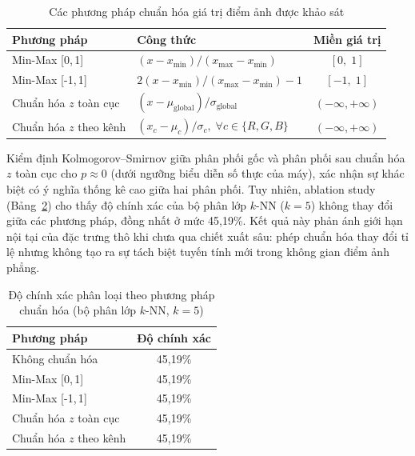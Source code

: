 \begin{table}[H]
    \centering
    \caption{Các phương pháp chuẩn hóa giá trị điểm ảnh được khảo sát}
    \label{tab:normalization}
    \begin{tabular}{llc}
        \hline
        \textbf{Phương pháp} & \textbf{Công thức} & \textbf{Miền giá trị} \\
        \hline
        Min-Max {[}0,\,1{]}       & $(x - x_{\min}) / (x_{\max} - x_{\min})$
            & $[0,\;1]$ \\
        Min-Max {[}-1,\,1{]}      & $2(x - x_{\min}) / (x_{\max} - x_{\min}) - 1$
            & $[-1,\;1]$ \\
        Chuẩn hóa $z$ toàn cục   & $(x - \mu_{\text{global}}) / \sigma_{\text{global}}$
            & $(-\infty,+\infty)$ \\
        Chuẩn hóa $z$ theo kênh  & $(x_c - \mu_c) / \sigma_c,\;\forall c \in \{R,G,B\}$
            & $(-\infty,+\infty)$ \\
        \hline
    \end{tabular}
\end{table}

Kiểm định Kolmogorov--Smirnov giữa phân phối gốc và phân phối sau chuẩn hóa
$z$ toàn cục cho $p \approx 0$ (dưới ngưỡng biểu diễn số thực của máy), xác
nhận sự khác biệt có ý nghĩa thống kê cao giữa hai phân phối. Tuy nhiên,
ablation study (Bảng~\ref{tab:norm_ablation}) cho thấy độ chính xác của bộ
phân lớp $k$-NN ($k = 5$) không thay đổi giữa các phương pháp, đồng nhất ở
mức 45,19\%. Kết quả này phản ánh giới hạn nội tại của đặc trưng thô khi chưa
qua chiết xuất sâu: phép chuẩn hóa thay đổi tỉ lệ nhưng không tạo ra sự tách
biệt tuyến tính mới trong không gian điểm ảnh phẳng.

\begin{table}[H]
    \centering
    \caption{Độ chính xác phân loại theo phương pháp chuẩn hóa
        (bộ phân lớp $k$-NN, $k=5$)}
    \label{tab:norm_ablation}
    \begin{tabular}{lc}
        \hline
        \textbf{Phương pháp} & \textbf{Độ chính xác} \\
        \hline
        Không chuẩn hóa          & 45,19\% \\
        Min-Max {[}0,\,1{]}      & 45,19\% \\
        Min-Max {[}-1,\,1{]}     & 45,19\% \\
        Chuẩn hóa $z$ toàn cục  & 45,19\% \\
        Chuẩn hóa $z$ theo kênh & 45,19\% \\
        \hline
    \end{tabular}
\end{table}

